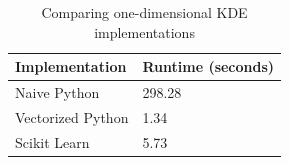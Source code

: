 \documentclass[11pt]{article}
\begin{document}


\begin{table}[h!]
\centering
\begin{tabular}{@{}ll@{}}
\toprule
Implementation			& Runtime (seconds)       	\\
\midrule
Naive Python			& 298.28				\\
Vectorized Python		& 1.34				\\
Scikit Learn			& 5.73				\\
\bottomrule
\end{tabular}
\caption{Comparing one-dimensional KDE implementations}
\label{compare_kde}
\end{table}


\end{document}

